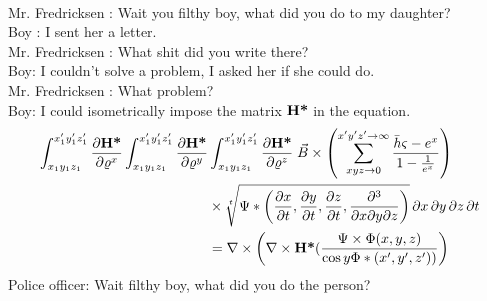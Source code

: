 \documentclass[11pt,executivepaper,landscape]{article}
\author{Ahmed Saad Sabit}
\begin{document}
 \
\vspace{3cm}
\
\\
Mr. Fredricksen : Wait you filthy boy, what did you do to my daughter?\\
Boy : I sent her a letter.\\
Mr. Fredricksen : What shit did you write there?\\
Boy: I couldn't solve a problem, I asked her if she could do.\\
Mr. Fredricksen : What problem?\\
Boy: I could isometrically impose the matrix $\text{\textbf{H*}}$ in the equation.
 \begin{align}
 \int_{x_1y_1z_1}^{x'_1y'_1z'_1} \frac{\partial \text{\textbf{H*}}}
 {\partial \varrho^x} 
  \int_{x_1y_1z_1}^{x'_1y'_1z'_1}\frac{\partial \text{\textbf{H*}}}{\partial \varrho^y}
  & \int_{x_1y_1z_1}^{x'_1y'_1z'_1}\frac{\partial \text{\textbf{H*}}}{\partial \varrho^z}  \;
 \vec{B} \times  \left( \sum_{xyz \rightarrow 0}^{x'y'z' \rightarrow \infty} \frac{\bar{h} \varsigma - e^x}{1- \frac{1}{e^x}} \right) \notag \\
& \times
 \sqrt[t]{\Psi* \left(\frac{\partial x}{\partial t},\frac{\partial y}{\partial t},\frac{\partial z}{\partial t},
  \frac{\partial ^3}{\partial x \partial y \partial z}\right)}
 \,
 \partial x \, \partial y \, \partial z \, \partial t  \notag \\
& =
 \nabla  \times \left( \nabla \times \text{\textbf{H*}} ( \frac{\Psi \times \Phi(x,y,z)}{\cos y \Phi*(x',y',z'))}\right)
 \notag
 \end{align}
Police officer: Wait filthy boy, what did you do the person?
\end{document}
